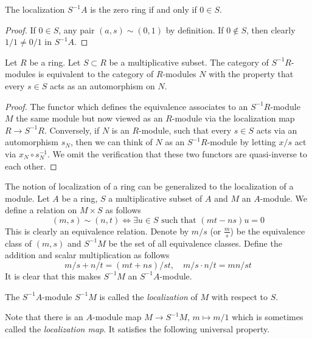 \begin{lemma}
\label{lemma-localization-zero}
The localization $S^{-1}A$ is the zero ring if and only if $0\in S$.
\end{lemma}

\begin{proof}
If $0\in S$, any pair $(a, s)\sim (0, 1)$ by definition.
If $0\not \in S$, then clearly $1/1 \neq 0/1$ in $S^{-1}A$.
\end{proof}

\begin{lemma}
\label{lemma-localization-and-modules}
Let $R$ be a ring. Let $S \subset R$ be a multiplicative subset.
The category of $S^{-1}R$-modules is equivalent to the category
of $R$-modules $N$ with the property that every $s \in S$ acts as
an automorphism on $N$.
\end{lemma}

\begin{proof}
The functor which defines the equivalence associates to an $S^{-1}R$-module
$M$ the same module but now viewed as an $R$-module via the localization
map $R \to S^{-1}R$. Conversely, if $N$ is an $R$-module, such that every
$s \in S$ acts via an automorphism $s_N$, then we can think of $N$ as an
$S^{-1}R$-module by letting $x/s$ act via $x_N  \circ s_N^{-1}$.
We omit the verification that these two functors are quasi-inverse to
each other.
\end{proof}

\noindent
The notion of localization of a ring can be generalized to the
localization of a module. Let $A$ be a ring, $S$ a multiplicative
subset of $A$ and $M$ an $A$-module. We define a relation on
$M \times S$ as follows
$$
(m, s) \sim (n, t)
\Leftrightarrow
\exists u\in S \text{ such that } (mt-ns)u = 0
$$
This is clearly an equivalence relation. Denote by $m/s$ (or
$\frac{m}{s}$) be the equivalence class of $(m, s)$ and $S^{-1}M$ be
the set of all equivalence classes. Define the addition and scalar
multiplication as follows
$$
m/s + n/t = (mt + ns)/st,\quad
m/s\cdot n/t = mn/st
$$
It is clear that this makes $S^{-1}M$ an $S^{-1}A$-module.

\begin{definition}
\label{definition-localization-module}
The $S^{-1}A$-module $S^{-1}M$ is called the {\it localization} of $M$
with respect to $S$.
\end{definition}

\noindent
Note that there is an $A$-module map $M \to S^{-1}M$, $m \mapsto m/1$
which is sometimes
called the {\it localization map}. It satisfies the following universal
property.

